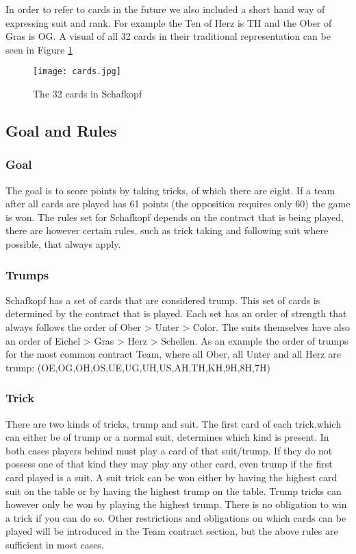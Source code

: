 \newline
In order to refer to cards in the future we also included a short hand way of expressing suit and rank.
For example the Ten of Herz is TH and the Ober of Gras is OG.
A visual of all 32 cards in their traditional representation can be seen in Figure \ref{fig:32cards}
\begin{figure}[h!]
    \centering
    \texttt{[image: cards.jpg]}
    \caption{The 32 cards in Schafkopf}
    \label{fig:32cards}
\end{figure}

\subsection{Goal and Rules}

\subsubsection{Goal}
The goal is to score points by taking tricks, of which there are eight.
If a team after all cards are played has 61 points (the opposition requires only 60) the game is won.
The rules set for Schafkopf depends on the contract that is being played, there are however certain rules, such as
trick taking and following suit where possible, that always apply.

\subsubsection{Trumps}
Schafkopf has a set of cards that are considered trump.
This set of cards is determined by the contract that is played.
\newline
Each set has an order of strength that always follows the order of Ober > Unter > Color.
The suits themselves have also an order of Eichel > Gras > Herz > Schellen.
As an example the order of trumps for the most common contract Team, where all Ober, all Unter and all Herz are trump:
\newline
(OE,OG,OH,OS,UE,UG,UH,US,AH,TH,KH,9H,8H,7H)

\subsubsection{Trick}
There are two kinds of tricks, trump and suit.
The first card of each trick,which can either be of trump or a normal suit, determines which kind is present.
In both cases players behind must play a card of that suit/trump.
If they do not possess one of that kind they may play any other card, even trump if the first card played is a suit.
\newline
A suit trick can be won either by having the highest card suit on the table or by having the highest trump on the table.
Trump tricks can however only be won by playing the highest trump.
There is no obligation to win a trick if you can do so.
Other restrictions and obligations on which cards can be played will be introduced in the Team contract section,
but the above rules are sufficient in most cases.

